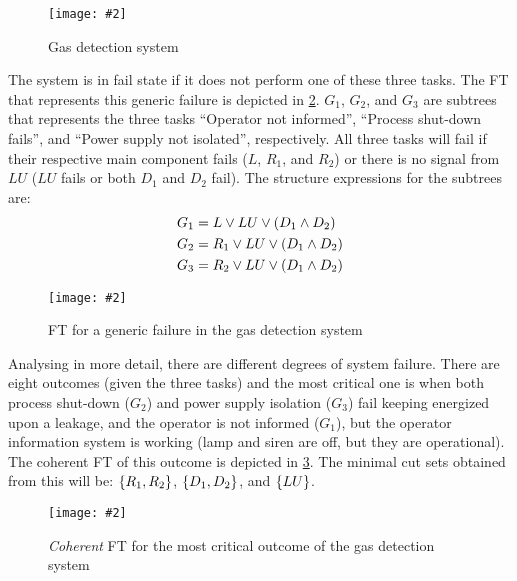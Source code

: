 \documentclass[12pt,openright,twoside,a4paper,oldfontcommands,english,brazil,draft]{abntex2}
\theoremstyle{theo}
\newcommand{\includegraphicsaspectratio}[2][1]{%
  \texttt{[image: \#2]}%
}
\newcommand{\setsin}[1]{\ensuremath\left\{ #1 \right\}}
\newcommand{\parsin}[1]{\ensuremath\left( #1 \right)}
\begin{document}
\begin{figure}[t]
  \centering
  \includegraphicsaspectratio[0.45]{gas-detection-system}
  \caption{Gas detection system}
  \label{fig:gas-detection-system}
\end{figure}

The system is in fail state if it does not perform one of these three tasks.
The \acl{FT} that represents this generic failure is depicted in \cref{fig:ft-generic-failure-gas-detection-system}.
$G_1$, $G_2$, and $G_3$ are subtrees that represents the three tasks ``Operator not informed'', ``Process shut-down fails'', and ``Power supply not isolated'', respectively.
All three tasks will fail if their respective main component fails ($L$, $R_1$, and $R_2$) or there is no signal from $LU$ ($LU$ fails or both $D_1$ and $D_2$ fail).
The structure expressions for the subtrees are:
%
\begin{align*}
  G_1 & = L \lor LU \lor \parsin{D_1 \land D_2}\\
  G_2 & = R_1 \lor LU \lor \parsin{D_1 \land D_2}\\
  G_3 & = R_2 \lor LU \lor \parsin{D_1 \land D_2}
\end{align*}

\begin{figure}[t]
  \centering
  \includegraphicsaspectratio[1]{ft-generic-failure-gas-detection-system}
  \caption{\ac{FT} for a generic failure in the gas detection system}
  \label{fig:ft-generic-failure-gas-detection-system}
\end{figure}

Analysing in more detail, there are different degrees of system failure.
There are eight outcomes (given the three tasks) and the most critical one is when both process shut-down ($G_2$) and power supply isolation ($G_3$) fail keeping energized upon a leakage, and the operator is not informed ($G_1$), but the operator information system is working (lamp and siren are off, but they are operational).
The coherent \ac{FT} of this outcome is depicted in \cref{fig:outcome-4-coherent-ft}.
The minimal cut sets obtained from this will be: $\setsin{R_1, R_2}$, $\setsin{D_1, D_2}$, and $\setsin{LU}$.

\begin{figure}[t]
  \centering
  \includegraphicsaspectratio[0.5]{outcome-4-coherent-ft}
  \caption{\emph{Coherent} \ac{FT} for the most critical outcome of the gas detection system}
  \label{fig:outcome-4-coherent-ft}
\end{figure}
\end{document}
